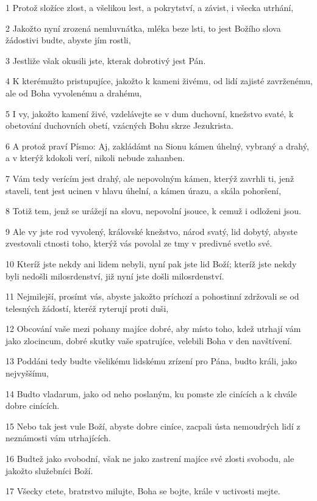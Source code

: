 \par 1 Protož složíce zlost, a všelikou lest, a pokrytství, a závist, i všecka utrhání,
\par 2 Jakožto nyní zrozená nemluvnátka, mléka beze lsti, to jest Božího slova žádostivi budte, abyste jím rostli,
\par 3 Jestliže však okusili jste, kterak dobrotivý jest Pán.
\par 4 K kterémužto pristupujíce, jakožto k kameni živému, od lidí zajisté zavrženému, ale od Boha vyvolenému a drahému,
\par 5 I vy, jakožto kamení živé, vzdelávejte se v dum duchovní, knežstvo svaté, k obetování duchovních obetí, vzácných Bohu skrze Jezukrista.
\par 6 A protož praví Písmo: Aj, zakládámt na Sionu kámen úhelný, vybraný a drahý, a v kterýž kdokoli verí, nikoli nebude zahanben.
\par 7 Vám tedy verícím jest drahý, ale nepovolným kámen, kterýž zavrhli ti, jenž staveli, tent jest ucinen v hlavu úhelní, a kámen úrazu, a skála pohoršení,
\par 8 Totiž tem, jenž se urážejí na slovu, nepovolní jsouce, k cemuž i odloženi jsou.
\par 9 Ale vy jste rod vyvolený, královské knežstvo, národ svatý, lid dobytý, abyste zvestovali ctnosti toho, kterýž vás povolal ze tmy v predivné svetlo své.
\par 10 Kteríž jste nekdy ani lidem nebyli, nyní pak jste lid Boží; kteríž jste nekdy byli nedošli milosrdenství, již nyní jste došli milosrdenství.
\par 11 Nejmilejší, prosímt vás, abyste jakožto príchozí a pohostinní zdržovali se od telesných žádostí, kteréž ryterují proti duši,
\par 12 Obcování vaše mezi pohany majíce dobré, aby místo toho, kdež utrhají vám jako zlocincum, dobré skutky vaše spatrujíce, velebili Boha v den navštívení.
\par 13 Poddáni tedy budte všelikému lidskému zrízení pro Pána, budto králi, jako nejvyššímu,
\par 14 Budto vladarum, jako od neho poslaným, ku pomste zle cinících a k chvále dobre cinících.
\par 15 Nebo tak jest vule Boží, abyste dobre ciníce, zacpali ústa nemoudrých lidí z neznámosti vám utrhajících.
\par 16 Budtež jako svobodní, však ne jako zastrení majíce své zlosti svobodu, ale jakožto služebníci Boží.
\par 17 Všecky ctete, bratrstvo milujte, Boha se bojte, krále v uctivosti mejte.
